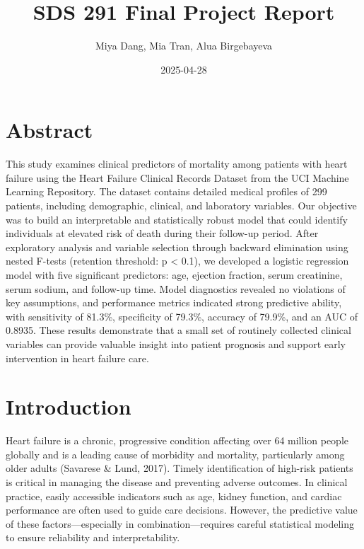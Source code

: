 \documentclass[
  letterpaper,
  DIV=11,
  numbers=noendperiod]{scrartcl}
\title{SDS 291 Final Project Report}
\author{Miya Dang, Mia Tran, Alua Birgebayeva}
\date{2025-04-28}
\begin{document}
\maketitle
\ifdefined\Shaded\renewenvironment{Shaded}{\begin{tcolorbox}[interior hidden, breakable, frame hidden, borderline west={3pt}{0pt}{shadecolor}, enhanced, sharp corners, boxrule=0pt]}{\end{tcolorbox}}\fi

\hypertarget{abstract}{%
\section{Abstract}\label{abstract}}

This study examines clinical predictors of mortality among patients with
heart failure using the Heart Failure Clinical Records Dataset from the
UCI Machine Learning Repository. The dataset contains detailed medical
profiles of 299 patients, including demographic, clinical, and
laboratory variables. Our objective was to build an interpretable and
statistically robust model that could identify individuals at elevated
risk of death during their follow-up period. After exploratory analysis
and variable selection through backward elimination using nested F-tests
(retention threshold: p \textless{} 0.1), we developed a logistic
regression model with five significant predictors: age, ejection
fraction, serum creatinine, serum sodium, and follow-up time. Model
diagnostics revealed no violations of key assumptions, and performance
metrics indicated strong predictive ability, with sensitivity of 81.3\%,
specificity of 79.3\%, accuracy of 79.9\%, and an AUC of 0.8935. These
results demonstrate that a small set of routinely collected clinical
variables can provide valuable insight into patient prognosis and
support early intervention in heart failure care.

\hypertarget{introduction}{%
\section{Introduction}\label{introduction}}

Heart failure is a chronic, progressive condition affecting over 64
million people globally and is a leading cause of morbidity and
mortality, particularly among older adults (Savarese \& Lund, 2017).
Timely identification of high-risk patients is critical in managing the
disease and preventing adverse outcomes. In clinical practice, easily
accessible indicators such as age, kidney function, and cardiac
performance are often used to guide care decisions. However, the
predictive value of these factors---especially in combination---requires
careful statistical modeling to ensure reliability and interpretability.
\end{document}
